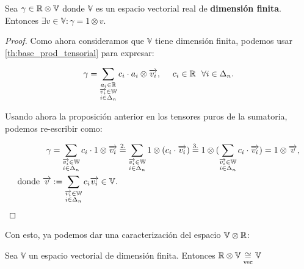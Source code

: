 \begin{proposicion} \label{prop:r_otimes_v_es_v}
	Sea $\gamma \in \mathbb{R} \otimes \mathbb{V}$ donde $\mathbb{V}$ es un espacio vectorial real de \textbf{dimensión finita}. Entonces $\exists v \in \mathbb{V}: \gamma = 1 \otimes v$.
\end{proposicion}
\begin{proof}
	Como ahora consideramos que $\mathbb{V}$ tiene dimensión finita, podemos usar \ref{th:base_prod_tensorial} para expresar:

	\begin{equation}
		\gamma = \sum_{\substack{a_i \in \mathbb{R}\\ \overrightarrow{v_i} \in \mathbb{W}\\ i \in \Delta_{n}}} c_{i} \cdot a_i \otimes \overrightarrow{v_i}, \ \ \ \  c_{i} \in \mathbb{R} \ \  \forall i \in \Delta_{n}.
	\end{equation}

	Usando ahora la proposición anterior en los tensores puros de la sumatoria, podemos re-escribir como:

	\begin{equation}
		\begin{split}
			\gamma &= \sum_{\substack{\overrightarrow{v_i} \in \mathbb{W}\\ i \in \Delta_{n}}} c_{i} \cdot 1 \otimes \overrightarrow{v_i} \stackrel{\text{2.}}{=} \sum_{\substack{\overrightarrow{v_i} \in \mathbb{W}\\ i \in \Delta_{n}}} 1 \otimes (c_{i} \cdot \overrightarrow{v_i}) \stackrel{\text{3.}}{=} 1 \otimes ( \sum_{\substack{\overrightarrow{v_i} \in \mathbb{W} \\ i \in \Delta_{n}}} c_{i} \cdot \overrightarrow{v_i} ) = 1 \otimes \overrightarrow{v}, \\
			\text{donde } \overrightarrow{v} &:= \sum_{\substack{\overrightarrow{v_i} \in \mathbb{W}\\ i \in \Delta_{n}}} c_{i} \overrightarrow{v_i} \in \mathbb{V}. \\
		\end{split}
	\end{equation}

\end{proof}

Con esto, ya podemos dar una caracterización del espacio $\mathbb{V} \otimes \mathbb{R}$:

\begin{proposicion}
	Sea $\mathbb{V}$ un espacio vectorial de dimensión finita. Entonces $\mathbb{R} \otimes \mathbb{V} \underset{\text{vec}}{\cong} \mathbb{V}$
\end{proposicion}

